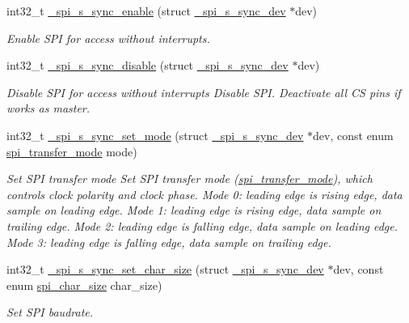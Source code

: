 \begin{DoxyCompactItemize}
int32\+\_\+t \hyperlink{group__hpl__spi_ga92a6db85ee5f31aa57b1aa4e712f14e7}{\+\_\+spi\+\_\+s\+\_\+sync\+\_\+enable} (struct \hyperlink{group__hpl__spi_ga36cf082f9d7764b69f43a52f039e7165}{\+\_\+spi\+\_\+s\+\_\+sync\+\_\+dev} $\ast$dev)
\begin{DoxyCompactList}\small\item\em Enable S\+PI for access without interrupts. \end{DoxyCompactList}\item 
int32\+\_\+t \hyperlink{group__hpl__spi_gaece136abe12e7e2945fcb7b28d1bb5e1}{\+\_\+spi\+\_\+s\+\_\+sync\+\_\+disable} (struct \hyperlink{group__hpl__spi_ga36cf082f9d7764b69f43a52f039e7165}{\+\_\+spi\+\_\+s\+\_\+sync\+\_\+dev} $\ast$dev)
\begin{DoxyCompactList}\small\item\em Disable S\+PI for access without interrupts Disable S\+PI. Deactivate all CS pins if works as master. \end{DoxyCompactList}\item 
int32\+\_\+t \hyperlink{group__hpl__spi_ga0dc0439caabbb1ed80874e97c7ba67a7}{\+\_\+spi\+\_\+s\+\_\+sync\+\_\+set\+\_\+mode} (struct \hyperlink{group__hpl__spi_ga36cf082f9d7764b69f43a52f039e7165}{\+\_\+spi\+\_\+s\+\_\+sync\+\_\+dev} $\ast$dev, const enum \hyperlink{group__hpl__spi_ga9c30fdfffba6be76b4044ccb17b218e5}{spi\+\_\+transfer\+\_\+mode} mode)
\begin{DoxyCompactList}\small\item\em Set S\+PI transfer mode Set S\+PI transfer mode (\hyperlink{group__hpl__spi_ga9c30fdfffba6be76b4044ccb17b218e5}{spi\+\_\+transfer\+\_\+mode}), which controls clock polarity and clock phase. Mode 0\+: leading edge is rising edge, data sample on leading edge. Mode 1\+: leading edge is rising edge, data sample on trailing edge. Mode 2\+: leading edge is falling edge, data sample on leading edge. Mode 3\+: leading edge is falling edge, data sample on trailing edge. \end{DoxyCompactList}\item 
int32\+\_\+t \hyperlink{group__hpl__spi_ga986f5f676a69c705d5239fd53193864a}{\+\_\+spi\+\_\+s\+\_\+sync\+\_\+set\+\_\+char\+\_\+size} (struct \hyperlink{group__hpl__spi_ga36cf082f9d7764b69f43a52f039e7165}{\+\_\+spi\+\_\+s\+\_\+sync\+\_\+dev} $\ast$dev, const enum \hyperlink{group__hpl__spi_ga4a3ef460c2cea333834811806f32d60a}{spi\+\_\+char\+\_\+size} char\+\_\+size)
\begin{DoxyCompactList}\small\item\em Set S\+PI baudrate. \end{DoxyCompactList}\item 

\end{DoxyCompactItemize}
